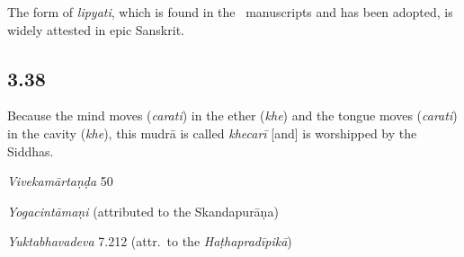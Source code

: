 \begin{ekdosis}
\begin{philcomm}[hp03_037]
The form of \emph{lipyati}, which is found in the \alpha \ manuscripts and has been adopted, is widely attested in epic Sanskrit.
\end{philcomm}

\subsection*{3.38}
\begin{translation}[hp03_038]
Because the mind moves (\emph{carati}) in the ether (\emph{khe}) and the tongue moves (\emph{carati}) in the cavity (\emph{khe}), this mudrā is called \emph{khecarī} [and] is worshipped by the Siddhas.
\end{translation}

\begin{sources}[hp03_038]
\emph{Vivekamārtaṇḍa} 50
\begin{versinnote}
\tl{\var{37c tenaiṣā ] tenaiva, teneyaṃ \vl 37cd nāma mudrā ] mudrā sarva° \vl}\\!}
\end{versinnote}
\end{sources}

\begin{testimonia}[hp03_038]
\emph{Yogacintāmaṇi} (attributed to the Skandapurāṇa)
\begin{versinnote}
\end{versinnote}

\emph{Yuktabhavadeva} 7.212 (attr.~to the \emph{Haṭhapradīpikā})
\begin{versinnote}
\end{versinnote}
\end{testimonia}



\end{ekdosis}
